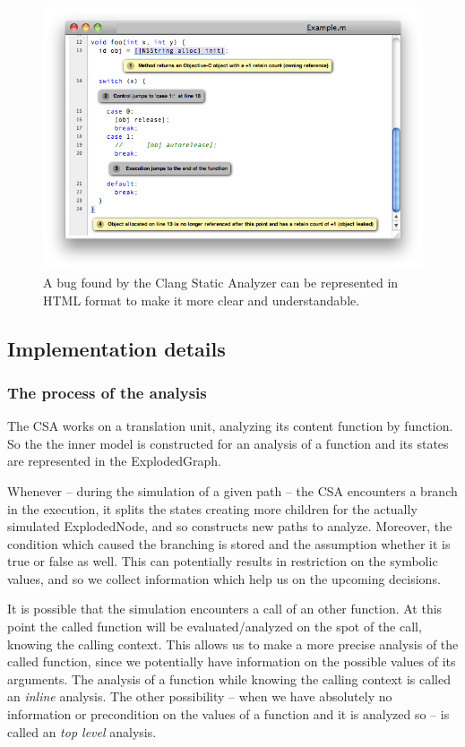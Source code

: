 \begin{figure}[h]
	\centering
	\includegraphics[width=1\textwidth]{img/view}
	\caption{A bug found by the Clang Static Analyzer can be represented in HTML format to make it more clear and understandable.}
	\label{fig:hibak_megjelenitese}
\end{figure}

\subsection{Implementation details}
\subsubsection{The process of the analysis}
The CSA works on a translation unit, analyzing its content function by function. So the the inner model is constructed for an analysis of a function and its states are represented in the ExplodedGraph.

Whenever -- during the simulation of a given path -- the CSA encounters a branch in the execution, it splits the states creating more children for the actually simulated ExplodedNode, and so constructs new paths to analyze. Moreover, the condition which caused the branching is stored and the assumption whether it is true or false as well. This can potentially results in restriction on the symbolic values, and so we collect information which help us on the upcoming decisions.

It is possible that the simulation encounters a call of an other function.
At this point the called function will be evaluated/analyzed on the spot of the call, knowing the calling context. This allows us to make a more precise analysis of the called function, since we potentially have information on the possible values of its arguments. The analysis of a function while knowing the calling context is called an \textit{inline} analysis. The other possibility -- when we have absolutely no information or precondition on the values of a function and it is analyzed so -- is called an \textit{top level} analysis. 

